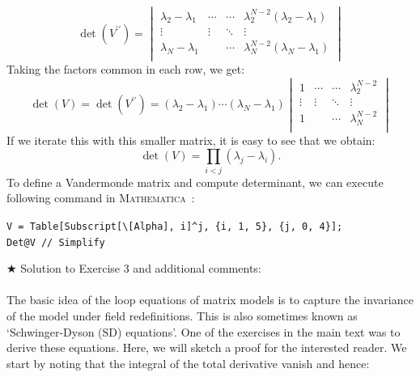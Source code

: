 \documentclass[11pt]{article}
\newcommand{\MA}{\textsc{Mathematica}}
\begin{document}
\begin{equation}
	\det(V^{\prime\prime}) = 
	\begin{vmatrix}
		 \lambda_2 - \lambda_1 & \cdots & \cdots & \lambda_2^{N-2}(\lambda_2 - \lambda_1) \\ 
		\vdots  & \vdots  & \ddots & \vdots  \\
		\lambda_N - \lambda_1 &  & \cdots &  \lambda_N^{N-2}(\lambda_N - \lambda_1) \\
	\end{vmatrix}
\end{equation}
Taking the factors common in each row, we get:
\begin{equation}
	\det(V) = \det(V^{\prime\prime}) = 
	(\lambda_2 - \lambda_1) \cdots (\lambda_N - \lambda_1)
	\begin{vmatrix}
		1 & \cdots & \cdots & \lambda_2^{N-2} \\ 
		\vdots  & \vdots  & \ddots & \vdots  \\
		1 &  & \cdots &  \lambda_N^{N-2} \\
	\end{vmatrix}
\end{equation}
If we iterate this with this smaller matrix, it is easy to see that we obtain:
\begin{equation}
	\det(V) = \prod_{i<j} (\lambda_j - \lambda_i).
\end{equation}
To define a Vandermonde matrix and compute determinant, we can execute following command in \MA~:
\begin{mdframed}[backgroundcolor=magenta!2]
	\begin{footnotesize} 
		\verb"V = Table[Subscript[\[Alpha], i]^j, {i, 1, 5}, {j, 0, 4}];"\\ 
		\verb"Det@V // Simplify"
	\end{footnotesize} 
\end{mdframed}

\noindent $\bigstar$ Solution to Exercise 3 and additional comments: 
\\ \\ 
The basic idea of the loop equations of matrix models is to capture the invariance of the model under field redefinitions. This is also sometimes known as `Schwinger-Dyson (SD) equations'. One of the exercises in the main text was to derive these equations. Here, we will sketch a proof for the interested reader. We start by noting that the integral of the total derivative vanish and hence:
\end{document}
